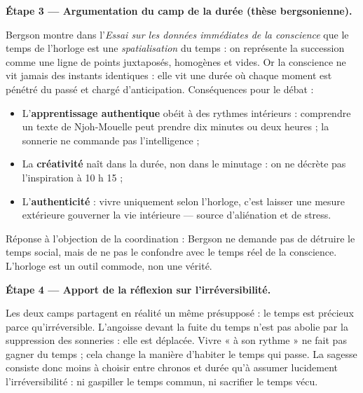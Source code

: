\documentclass[11pt]{article}
\newcommand{\cle}[1]{{\popxbold\color{popdark}#1}}
\begin{document}
\begin{exoresolu}
\textbf{Étape 3 — Argumentation du camp de la \cle{durée} (thèse bergsonienne).}\par
Bergson montre dans l'\emph{Essai sur les données immédiates de la conscience} que le temps de l'horloge est une \emph{spatialisation} du temps : on représente la succession comme une ligne de points juxtaposés, homogènes et vides. Or la conscience ne vit jamais des instants identiques : elle vit une \cle{durée} où chaque moment est pénétré du passé et chargé d'anticipation. Conséquences pour le débat :
\begin{itemize}
\item L'\textbf{apprentissage authentique} obéit à des rythmes intérieurs : comprendre un texte de Njoh-Mouelle peut prendre dix minutes ou deux heures ; la sonnerie ne commande pas l'intelligence ;
\item La \textbf{créativité} naît dans la durée, non dans le minutage : on ne décrète pas l'inspiration à 10 h 15 ;
\item L'\textbf{authenticité} : vivre uniquement selon l'horloge, c'est laisser une mesure extérieure gouverner la vie intérieure — source d'aliénation et de stress.
\end{itemize}
Réponse à l'objection de la coordination : Bergson ne demande pas de détruire le temps social, mais de ne pas le confondre avec le temps réel de la conscience. L'horloge est un outil commode, non une vérité.

\textbf{Étape 4 — Apport de la réflexion sur l'irréversibilité.}\par
Les deux camps partagent en réalité un même présupposé : le temps est précieux parce qu'\cle{irréversible}. L'angoisse devant la fuite du temps n'est pas abolie par la suppression des sonneries : elle est déplacée. Vivre « à son rythme » ne fait pas gagner du temps ; cela change la manière d'habiter le temps qui passe. La sagesse consiste donc moins à choisir entre \cle{chronos} et \cle{durée} qu'à assumer lucidement l'irréversibilité : ni gaspiller le temps commun, ni sacrifier le temps vécu.


\end{exoresolu}
\end{document}
